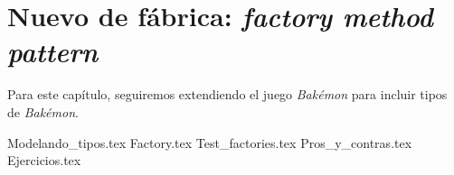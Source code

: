 \chapter{Nuevo de fábrica: \textit{factory method pattern}}
\label{chap:ambiguo}
  Para este capítulo, seguiremos extendiendo el juego \textit{Bakémon} para incluir tipos de 
  \textit{Bakémon}.

  {Modelando_tipos.tex}
  {Factory.tex}
  {Test_factories.tex}
  {Pros_y_contras.tex}
  {Ejercicios.tex}

  \printbibliography[keyword=factory]